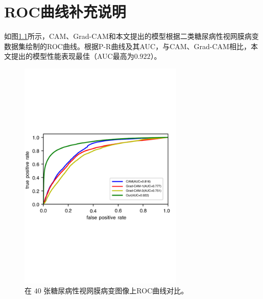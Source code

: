 \chapter{ROC曲线补充说明}\label{chapter:append1}
如图\ref{fig:roc_cam_grad_cam_our_diabetic_retinopathy}所示，CAM、Grad-CAM和本文提出的模型根据二类糖尿病性视网膜病变数据集绘制的ROC曲线。根据P-R曲线及其AUC，与CAM、Grad-CAM相比，本文提出的模型性能表现最佳（AUC最高为$0.922$）。
\begin{figure}[H]
	\centering
	\includegraphics[width=0.7\textwidth]{figure/ROC_cam_grad_cam_our_diabetic_retinopathy}
	\caption[在$40$张糖尿病性视网膜病变图像上ROC曲线对比]{在 $40$ 张糖尿病性视网膜病变图像上ROC曲线对比。}
	\label{fig:roc_cam_grad_cam_our_diabetic_retinopathy}
\end{figure}

